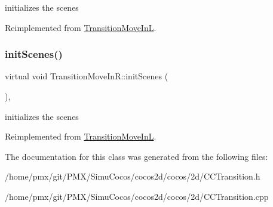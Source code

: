 initializes the scenes 

Reimplemented from \hyperlink{classTransitionMoveInL_aeb7630758110537b1098673f21d7d197}{Transition\+Move\+InL}.

\mbox{\label{classTransitionMoveInR_abea3ee2e03e712a74ffeb1be776b2ca8}} 
\subsubsection{\texorpdfstring{init\+Scenes()}{initScenes()}\hspace{0.1cm}{\footnotesize\ttfamily [2/2]}}
{\footnotesize\ttfamily virtual void Transition\+Move\+In\+R\+::init\+Scenes (\begin{DoxyParamCaption}{ }\end{DoxyParamCaption})\hspace{0.3cm}{\ttfamily [protected]}, {\ttfamily [virtual]}}

initializes the scenes 

Reimplemented from \hyperlink{classTransitionMoveInL_aeb7630758110537b1098673f21d7d197}{Transition\+Move\+InL}.



The documentation for this class was generated from the following files\+:\begin{DoxyCompactItemize}
\item 
/home/pmx/git/\+P\+M\+X/\+Simu\+Cocos/cocos2d/cocos/2d/C\+C\+Transition.\+h\item 
/home/pmx/git/\+P\+M\+X/\+Simu\+Cocos/cocos2d/cocos/2d/C\+C\+Transition.\+cpp\end{DoxyCompactItemize}
